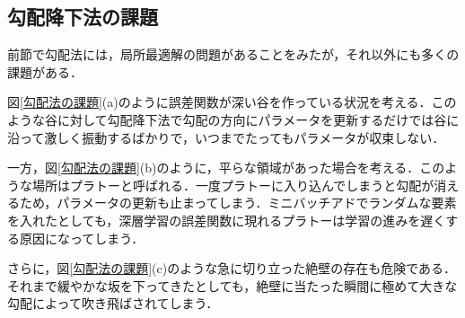 \documentclass[a4paper,11pt]{jsreport}
\begin{document}
\subsection{勾配降下法の課題}
前節で勾配法には，局所最適解の問題があることをみたが，それ以外にも多くの課題がある．\par
図\ref{勾配法の課題}(a)のように誤差関数が深い谷を作っている状況を考える．このような谷に対して勾配降下法で勾配の方向にパラメータを更新するだけでは谷に沿って激しく振動するばかりで，いつまでたってもパラメータが収束しない．\par
一方，図\ref{勾配法の課題}(b)のように，平らな領域があった場合を考える．このような場所はプラトーと呼ばれる．一度プラトーに入り込んでしまうと勾配が消えるため，パラメータの更新も止まってしまう．ミニバッチアドでランダムな要素を入れたとしても，深層学習の誤差関数に現れるプラトーは学習の進みを遅くする原因になってしまう．\par
さらに，図\ref{勾配法の課題}(c)のような急に切り立った絶壁の存在も危険である．それまで緩やかな坂を下ってきたとしても，絶壁に当たった瞬間に極めて大きな勾配によって吹き飛ばされてしまう．
\end{document}
